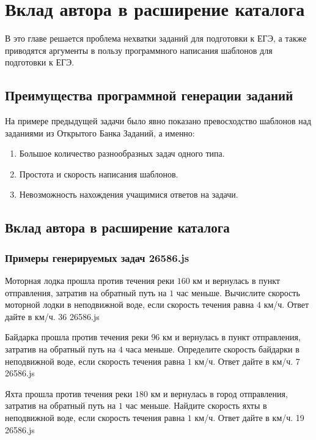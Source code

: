 \section{Вклад автора в расширение каталога}\label{2sect}
В это главе решается проблема нехватки заданий для подготовки к ЕГЭ, а также приводятся аргументы в пользу программного написания шаблонов для подготовки к ЕГЭ.

\subsection{Преимущества программной генерации заданий}
На примере предыдущей задачи было явно показано превосходство шаблонов над заданиями из Открытого Банка Заданий, а именно:
\begin{enumerate}
	\item Большое количество разнообразных задач одного типа. 
	\item Простота и скорость написания шаблонов. 
    \item Невозможность нахождения учащимися ответов на задачи.
\end{enumerate}

\subsection{Вклад автора в расширение каталога}


\subsubsection*{Примеры генерируемых задач 26586.js}

\par{Моторная лодка прошла против течения реки $160$ км и вернулась в пункт отправления, затратив на обратный путь на $1$ час меньше. Вычислите скорость моторной лодки в неподвижной воде, если скорость течения равна $4$ км/ч. Ответ дайте в км/ч. }{ 36 }{26586.js}
\par{Байдарка прошла против течения реки $96$ км и вернулась в пункт отправления, затратив на обратный путь на $4$ часа меньше. Определите скорость байдарки в неподвижной воде, если скорость течения равна $1$ км/ч. Ответ дайте в км/ч. }{ 7 }{26586.js}
\par{Яхта прошла против течения реки $180$ км и вернулась в город отправления, затратив на обратный путь на $1$ час меньше. Найдите скорость яхты в неподвижной воде, если скорость течения равна $1$ км/ч. Ответ дайте в км/ч. }{ 19 }{26586.js}

